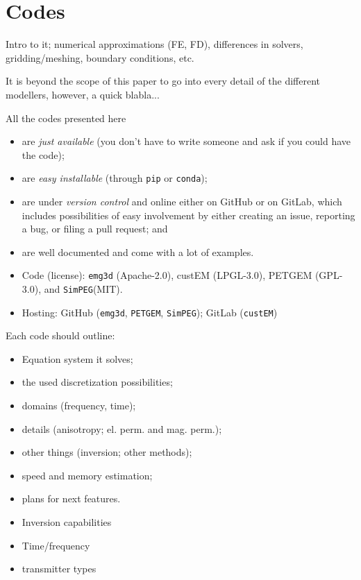 \documentclass[
    paper,
  ]{geophysics}
\newcommand{\emg}[2]{\texttt{emg#1#2}\xspace}
\newcommand{\simpeg}{\texttt{SimPEG}\xspace}
\newcommand{\custem}{\texttt{custEM}\xspace}
\newcommand{\petgem}{\texttt{PETGEM}\xspace}
\begin{document}
\section{Codes}

Intro to it; numerical approximations (FE, FD), differences in solvers,
gridding/meshing, boundary conditions, etc.

It is beyond the scope of this paper to go into every detail of the different
modellers, however, a quick blabla...

All the codes presented here
\begin{itemize}
  \item are \emph{just available} (you don't have to write someone and ask if
    you could have the code);
  \item are \emph{easy installable} (through \texttt{pip} or \texttt{conda});
  \item are under \emph{version control} and online either on GitHub or on
    GitLab, which includes possibilities of easy involvement by either creating
    an issue, reporting a bug, or filing a pull request; and
  \item are well documented and come with a lot of examples.
\end{itemize}

\begin{itemize}
  \item Code (license): \emg3d (Apache-2.0), custEM (LPGL-3.0), PETGEM
    (GPL-3.0), and \simpeg (MIT).
  \item Hosting: GitHub (\emg3d, \petgem, \simpeg); GitLab (\custem)
\end{itemize}




Each code should outline:

\begin{itemize}
  \item Equation system it solves;
  \item the used discretization possibilities;
  \item domains (frequency, time);
  \item details (anisotropy; el. perm. and mag. perm.);
  \item other things (inversion; other methods);
  \item speed and memory estimation;
  \item plans for next features.
  \item Inversion capabilities
  \item Time/frequency
  \item transmitter types
\end{itemize}
\end{document}
